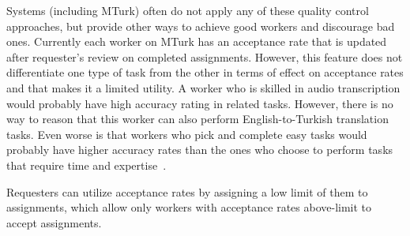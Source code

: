 Systems (including MTurk) often do not apply any of these quality control approaches, 
but provide other ways to achieve good workers and discourage bad ones. 
Currently each worker on MTurk has an acceptance rate that is updated after 
requester's review on completed assignments. However, this feature does not 
differentiate one type of task from the other in terms of effect on acceptance rates 
and that makes it a limited utility. A worker who is skilled in audio transcription would 
probably have high accuracy rating in related tasks. However, there is no way to 
reason that this worker can also perform English-to-Turkish translation tasks. 
Even worse is that workers who pick and complete easy tasks would probably 
have higher accuracy rates than the ones who choose to perform tasks that 
require time and expertise~\cite{Barowy2012}.

Requesters can utilize acceptance rates by assigning a low limit of them to 
assignments, which allow only workers with acceptance rates above-limit 
to accept assignments.
